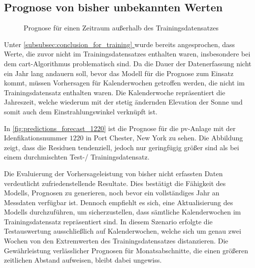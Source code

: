 \documentclass[12pt, a4paper]{article}
\newcommand*{\fullref}[1]{\hyperref[{#1}]{\autoref*{#1} \textit{\nameref*{#1}}}}
\begin{document}
\subsection{Prognose von bisher unbekannten Werten}


\begin{figure}[h]
\centering
\def\svgwidth{400pt}

\caption{Prognose für einen Zeitraum außerhalb des Trainingsdatensatzes}
\label{fig:predictions_forecast_1220}
\end{figure}

Unter \fullref{subsubsec:conclusion_for_training} wurde bereits angesprochen, dass Werte, die zuvor nicht im Trainingsdatensatzes enthalten waren, insbesondere bei dem \ac{cart}-Algorithmus problematisch sind. Da die Dauer der Datenerfassung nicht ein Jahr lang andauern soll, bevor das Modell für die Prognose zum Einsatz kommt, müssen Vorhersagen für Kalenderwochen getroffen werden, die nicht im Trainingsdatensatz enthalten waren. Die Kalenderwoche repräsentiert die Jahreszeit, welche wiederum mit der stetig ändernden Elevation der Sonne und somit auch dem Einstrahlungswinkel verknüpft ist.

In \autoref{fig:predictions_forecast_1220} ist die Prognose für die \ac{pv}-Anlage mit der Idenfikationsnummer $1220$ in Port Chester, New York zu sehen. Die Abbildung zeigt, dass die Residuen tendenziell, jedoch nur geringfügig größer sind als bei einem durchmischten Test-/ Trainingsdatensatz.

Die Evaluierung der Vorhersageleistung von bisher nicht erfassten Daten verdeutlicht zufriedenstellende Resultate. Dies bestätigt die Fähigkeit des Modells, Prognosen zu generieren, noch bevor ein vollständiges Jahr an Messdaten verfügbar ist. Dennoch empfiehlt es sich, eine Aktualisierung des Modells durchzuführen, um sicherzustellen, dass sämtliche Kalenderwochen im Trainingsdatensatz repräsentiert sind. In diesem Szenario erfolgte die Testauswertung ausschließlich auf Kalenderwochen, welche sich um genau zwei Wochen von den Extremwerten des Trainingsdatensatzes distanzieren. Die Gewährleistung verlässlicher Prognosen für Monatsabschnitte, die einen größeren zeitlichen Abstand aufweisen, bleibt dabei ungewiss.

\end{document}
